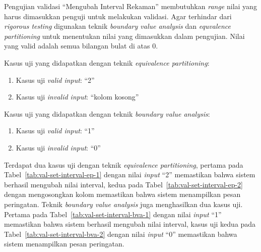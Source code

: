Pengujian validasi ``Mengubah Interval Rekaman'' membutuhkan
\emph{range} nilai yang harus dimasukkan penguji untuk melakukan
validasi. Agar terhindar dari \emph{rigorous testing} digunakan
teknik \emph{boundary value analysis} dan \emph{equvalence
  partitioning} untuk menentukan nilai yang dimasukkan dalam
pengujian. Nilai yang valid adalah semua bilangan bulat di atas 0.\newline

\noindent
Kasus uji yang didapatkan dengan teknik \emph{equivalence partitioning}:

\begin{enumerate}
\item Kasus uji \emph{valid input}: ``2''
\item Kasus uji \emph{invalid input}: ``kolom kosong''
\end{enumerate}

\noindent
Kasus uji yang didapatkan dengan teknik \emph{boundary value analysis}:

\begin{enumerate}
\item Kasus uji \emph{valid input}: ``1''
\item Kasus uji \emph{invalid input}: ``0''
\end{enumerate}

Terdapat dua kasus uji dengan teknik \emph{equivalence partitioning},
pertama pada Tabel~\ref{tab:val-set-interval-ep-1} dengan nilai \emph{input} ``2''
memastikan bahwa sistem berhasil mengubah nilai interval,
kedua pada Tabel~\ref{tab:val-set-interval-ep-2} dengan mengosongkan
kolom memastikan bahwa sistem menampilkan pesan peringatan. Teknik
\emph{boundary value analysis} juga menghasilkan dua kasus uji.
Pertama pada Tabel~\ref{tab:val-set-interval-bva-1} dengan nilai \emph{input}
``1'' memastikan bahwa sistem berhasil mengubah nilai interval, kasus
uji kedua pada Tabel~\ref{tab:val-set-interval-bva-2} dengan nilai \emph{input}
``0'' memastikan bahwa sistem menampilkan pesan peringatan.

